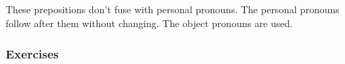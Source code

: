 These prepositions don't fuse with personal pronouns. The personal pronouns follow after them without changing. The object pronouns are used.

\subsubsection{Exercises}


